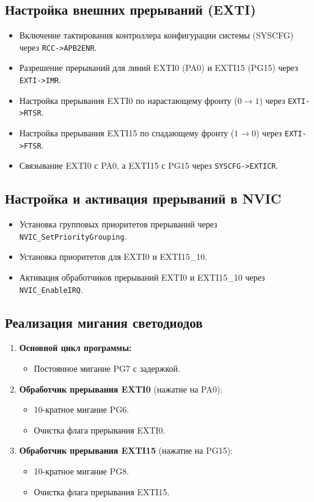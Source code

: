\subsection{Настройка внешних прерываний (EXTI)}
\begin{itemize}
    \item Включение тактирования контроллера конфигурации системы (SYSCFG) через \texttt{RCC->APB2ENR}.
    \item Разрешение прерываний для линий EXTI0 (PA0) и EXTI15 (PG15) через \texttt{EXTI->IMR}.
    \item Настройка прерывания EXTI0 по нарастающему фронту ($0 \to 1$) через \texttt{EXTI->RTSR}.
    \item Настройка прерывания EXTI15 по спадающему фронту ($1 \to 0$) через \texttt{EXTI->FTSR}.
    \item Связывание EXTI0 с PA0, а EXTI15 с PG15 через \texttt{SYSCFG->EXTICR}.
\end{itemize}

\subsection{Настройка и активация прерываний в NVIC}
\begin{itemize}
    \item Установка групповых приоритетов прерываний через \texttt{NVIC\_SetPriorityGrouping}.
    \item Установка приоритетов для EXTI0 и EXTI15\_10.
    \item Активация обработчиков прерываний EXTI0 и EXTI15\_10 через \texttt{NVIC\_EnableIRQ}.
\end{itemize}

\subsection{Реализация мигания светодиодов}
\begin{enumerate}
    \item \textbf{Основной цикл программы:}
    \begin{itemize}
        \item Постоянное мигание PG7 с задержкой.
    \end{itemize}
    
    \item \textbf{Обработчик прерывания EXTI0} (нажатие на PA0):
    \begin{itemize}
        \item 10-кратное мигание PG6.
        \item Очистка флага прерывания EXTI0.
    \end{itemize}
    
    \item \textbf{Обработчик прерывания EXTI15} (нажатие на PG15):
    \begin{itemize}
        \item 10-кратное мигание PG8.
        \item Очистка флага прерывания EXTI15.
    \end{itemize}
\end{enumerate}

